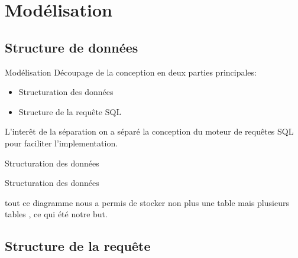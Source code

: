 \documentclass[10pt,handout]{beamer}
\newif\ifplacelogo %
\begin{document}
\section{Modélisation}

\subsection{Structure de données}

\begin{frame}{Modélisation}
Découpage de la conception en deux parties principales:
\begin{itemize}
  \item Structuration des données
  \item Structure de la requête SQL
\end{itemize}
\begin{block}{L'interêt de la séparation}
on a séparé la conception du moteur de requêtes SQL pour faciliter
l'implementation.

\end{block}


\end{frame}

\placelogofalse
\begin{frame}{Structuration des données}
\end{frame}
\placelogotrue

\begin{frame}{Structuration des données}
\begin{block}{}
  tout ce diagramme nous a permis de stocker non plus une table mais plusieurs
  tables , ce qui été notre but.
\end{block}
\end{frame}

\subsection{Structure de la requête}
\end{document}
